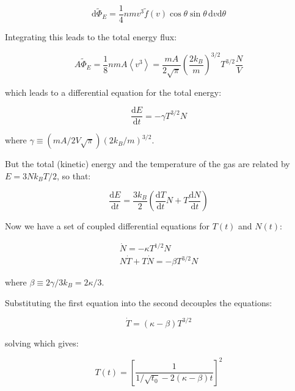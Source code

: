 \documentclass[12pt]{article}
\begin{document}
\begin{equation}
    \mathrm{d}\tilde{\Phi}_{E} = \frac{1}{4} nmv^{3} \tilde{f}(v) \cos{\theta} \sin{\theta} \, \mathrm{d}v \mathrm{d}\theta
\end{equation}

Integrating this leads to the total energy flux:

\begin{equation}
    A\tilde{\Phi}_{E} = \frac{1}{8} nmA \left\langle v^{3} \right\rangle = \frac{mA}{2\sqrt{\pi}} \left( \frac{2k_{B}}{m} \right)^{3/2} T^{3/2} \frac{N}{V}
\end{equation}

which leads to a differential equation for the total energy:

\begin{equation}
    \frac{\mathrm{d}E}{\mathrm{d}t} = -\gamma T^{3/2} N
\end{equation}

where $\gamma \equiv (mA/2V\sqrt{\pi}) (2k_{B}/m)^{3/2}$.

But the total (kinetic) energy and the temperature of the gas are related by $E = 3Nk_{B}T/2$, so that:

\begin{equation}
    \frac{\mathrm{d}E}{\mathrm{d}t} = \frac{3k_{B}}{2} \left( \frac{\mathrm{d}T}{\mathrm{d}t} N + T \frac{\mathrm{d}N}{\mathrm{d}t} \right)
\end{equation}

Now we have a set of coupled differential equations for $T(t)$ and $N(t)$:

\begin{equation}
    \begin{split}
        \dot{N} = -\kappa T^{1/2} N \\
        N\dot{T} + T\dot{N} = -\beta T^{3/2} N
    \end{split}
\end{equation}

where $\beta \equiv 2\gamma/3k_{B} = 2\kappa/3$.

Substituting the first equation into the second decouples the equations:

\begin{equation}
    \dot{T} = (\kappa - \beta) T^{3/2}
\end{equation}

solving which gives:

\begin{equation}
    T(t) = \left[ \frac{1}{1/\sqrt{t_{0}} - 2(\kappa - \beta) t} \right]^{2}
\end{equation}
\end{document}
